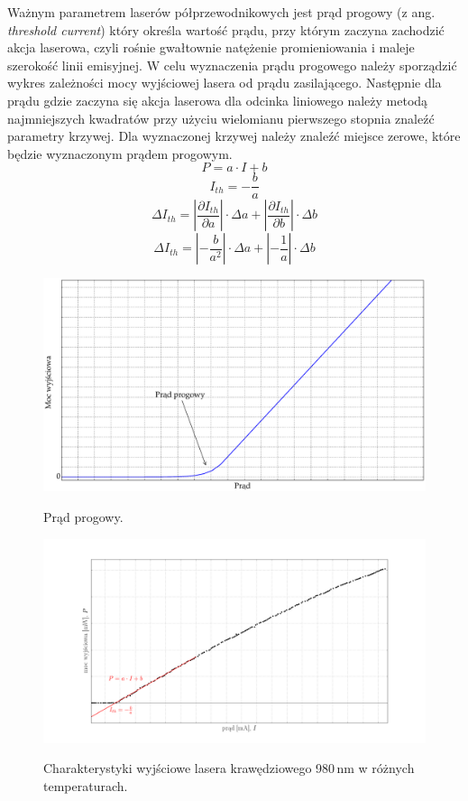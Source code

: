\documentclass[a4paper, portrait,12pt]{mwrep}
\begin{document}
Ważnym parametrem laserów półprzewodnikowych jest prąd progowy (z ang. \textit{threshold
current}) który określa wartość prądu, przy którym zaczyna zachodzić akcja laserowa, czyli
rośnie gwałtownie natężenie promieniowania i maleje szerokość linii emisyjnej. W celu wyznaczenia prądu progowego należy sporządzić wykres zależności mocy wyjściowej lasera od prądu zasilającego. Następnie dla prądu gdzie zaczyna się akcja laserowa dla odcinka liniowego należy metodą najmniejszych kwadratów przy użyciu wielomianu pierwszego stopnia znaleźć parametry krzywej. Dla wyznaczonej krzywej należy znaleźć miejsce zerowe, które będzie wyznaczonym prądem progowym.
\begin{equation}
P = a \cdot I + b
\end{equation}
\begin{equation}
I_{th} = -\frac{b}{a}
\end{equation}
\begin{equation}
\Delta I_{th} = \left\lvert \frac{\partial I_{th}}{\partial a} \right\rvert \cdot \Delta a + \left\lvert \frac{\partial I_{th}}{\partial b} \right\rvert \cdot \Delta b
\end{equation}
\begin{equation}
\Delta I_{th} = \left\lvert -\frac{b}{a^2} \right\rvert \cdot \Delta a + \left\lvert -\frac{1}{a} \right\rvert \cdot \Delta b 
\end{equation}
\begin{figure}
\center
  \includegraphics[scale=0.30]{plot_theory2.eps}
  \label{rys1}
  \caption{Prąd progowy.} 
\end{figure}
\begin{figure}
\center
  \includegraphics[scale=0.30]{plot_theory_i_th.png}
  \label{rys1}
  \caption{Charakterystyki wyjściowe lasera krawędziowego 980\,nm w różnych temperaturach. } 
\end{figure}
\end{document}
